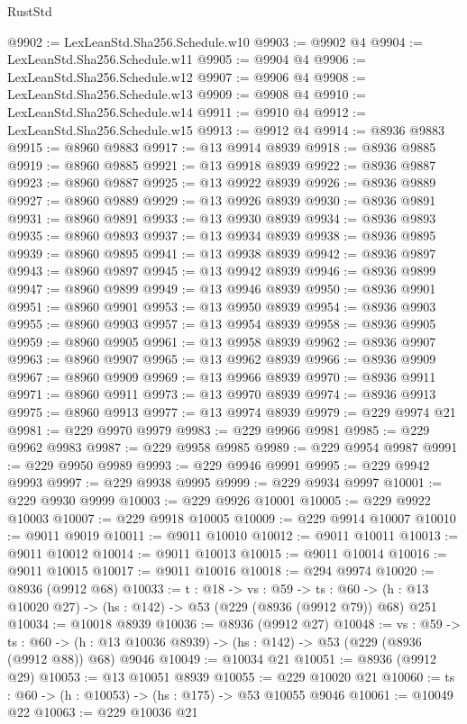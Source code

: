 \begin{lexlean}{RustStd}
\begin{coremodule}
@9902 := LexLeanStd.Sha256.Schedule.w10
@9903 := @9902 @4
@9904 := LexLeanStd.Sha256.Schedule.w11
@9905 := @9904 @4
@9906 := LexLeanStd.Sha256.Schedule.w12
@9907 := @9906 @4
@9908 := LexLeanStd.Sha256.Schedule.w13
@9909 := @9908 @4
@9910 := LexLeanStd.Sha256.Schedule.w14
@9911 := @9910 @4
@9912 := LexLeanStd.Sha256.Schedule.w15
@9913 := @9912 @4
@9914 := @8936 @9883
@9915 := @8960 @9883
@9917 := @13 @9914 @8939
@9918 := @8936 @9885
@9919 := @8960 @9885
@9921 := @13 @9918 @8939
@9922 := @8936 @9887
@9923 := @8960 @9887
@9925 := @13 @9922 @8939
@9926 := @8936 @9889
@9927 := @8960 @9889
@9929 := @13 @9926 @8939
@9930 := @8936 @9891
@9931 := @8960 @9891
@9933 := @13 @9930 @8939
@9934 := @8936 @9893
@9935 := @8960 @9893
@9937 := @13 @9934 @8939
@9938 := @8936 @9895
@9939 := @8960 @9895
@9941 := @13 @9938 @8939
@9942 := @8936 @9897
@9943 := @8960 @9897
@9945 := @13 @9942 @8939
@9946 := @8936 @9899
@9947 := @8960 @9899
@9949 := @13 @9946 @8939
@9950 := @8936 @9901
@9951 := @8960 @9901
@9953 := @13 @9950 @8939
@9954 := @8936 @9903
@9955 := @8960 @9903
@9957 := @13 @9954 @8939
@9958 := @8936 @9905
@9959 := @8960 @9905
@9961 := @13 @9958 @8939
@9962 := @8936 @9907
@9963 := @8960 @9907
@9965 := @13 @9962 @8939
@9966 := @8936 @9909
@9967 := @8960 @9909
@9969 := @13 @9966 @8939
@9970 := @8936 @9911
@9971 := @8960 @9911
@9973 := @13 @9970 @8939
@9974 := @8936 @9913
@9975 := @8960 @9913
@9977 := @13 @9974 @8939
@9979 := @229 @9974 @21
@9981 := @229 @9970 @9979
@9983 := @229 @9966 @9981
@9985 := @229 @9962 @9983
@9987 := @229 @9958 @9985
@9989 := @229 @9954 @9987
@9991 := @229 @9950 @9989
@9993 := @229 @9946 @9991
@9995 := @229 @9942 @9993
@9997 := @229 @9938 @9995
@9999 := @229 @9934 @9997
@10001 := @229 @9930 @9999
@10003 := @229 @9926 @10001
@10005 := @229 @9922 @10003
@10007 := @229 @9918 @10005
@10009 := @229 @9914 @10007
@10010 := @9011 @9019
@10011 := @9011 @10010
@10012 := @9011 @10011
@10013 := @9011 @10012
@10014 := @9011 @10013
@10015 := @9011 @10014
@10016 := @9011 @10015
@10017 := @9011 @10016
@10018 := @294 @9974
@10020 := @8936 (@9912 @68)
@10033 := {t : @18} ->
  {vs : @59} ->
  {ts : @60} -> (h : @13 @10020 @27) -> (hs : @142) -> @53 (@229 (@8936 (@9912 @79)) @68) @251
@10034 := @10018 @8939
@10036 := @8936 (@9912 @27)
@10048 := {vs : @59} ->
  {ts : @60} -> (h : @13 @10036 @8939) -> (hs : @142) -> @53 (@229 (@8936 (@9912 @88)) @68) @9046
@10049 := @10034 @21
@10051 := @8936 (@9912 @29)
@10053 := @13 @10051 @8939
@10055 := @229 @10020 @21
@10060 := {ts : @60} -> (h : @10053) -> (hs : @175) -> @53 @10055 @9046
@10061 := @10049 @22
@10063 := @229 @10036 @21

\end{coremodule}
\end{lexlean}

